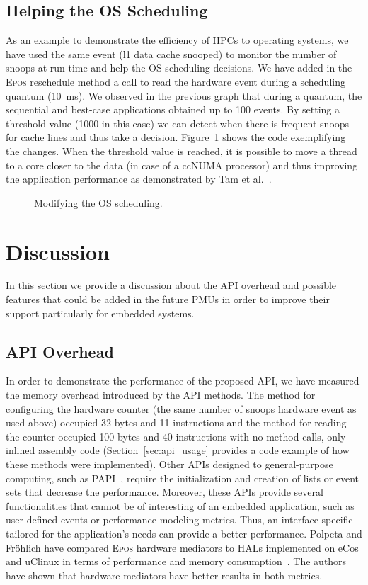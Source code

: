 \documentclass[conference]{IEEEtran}
\newcommand{\prg}[3][ht!]{
\begin{figure}[#1]
  
  \caption{#3}
  \label{prg:#2}
\end{figure}
}
\begin{document}
\subsection{Helping the OS Scheduling}

As an example to demonstrate the efficiency of HPCs to operating systems, we have used the same event (l1 data cache snooped) to monitor the number of snoops at run-time and help the OS scheduling decisions. We have added in the \textsc{Epos} reschedule method a call to read the hardware event during a scheduling quantum (10~ms). We observed in the previous graph that during a quantum, the sequential and best-case applications obtained up to 100 events. By setting a threshold value (1000 in this case) we can detect when there is frequent snoops for cache lines and thus take a decision. Figure~\ref{prg:scheduler_mod} shows the code exemplifying the changes. When the threshold value is reached, it is possible to move a thread to a core closer to the data (in case of a ccNUMA processor) and thus improving the application performance as demonstrated by Tam et al.~\cite{Tam:2007}. 

\prg{scheduler_mod}{Modifying the OS scheduling.}

\section{Discussion}
\label{sec:discussion}

In this section we provide a discussion about the API overhead and possible features that could be added in the future PMUs in order to improve their support particularly for embedded systems.

\subsection{API Overhead}

In order to demonstrate the performance of the proposed API, we have measured the memory overhead introduced by the API methods. The method for configuring the hardware counter (the same number of snoops hardware event as used above) occupied 32 bytes and 11 instructions and the method for reading the counter occupied 100 bytes and 40 instructions with no method calls, only inlined assembly code (Section~\ref{sec:api_usage} provides a code example of how these methods were implemented). Other APIs designed to general-purpose computing, such as PAPI~\cite{papi}, require the initialization and creation of lists or event sets that decrease the performance. Moreover, these APIs provide several functionalities that cannot be of interesting of an embedded application, such as user-defined events or performance modeling metrics. Thus, an interface specific tailored for the application's needs can provide a better performance. Polpeta and Fr\"{o}hlich have compared \textsc{Epos} hardware mediators to HALs implemented on eCos and uClinux in terms of performance and memory consumption~\cite{Polpeta05onthe}. The authors have shown that hardware mediators have better results in both metrics.
\end{document}
